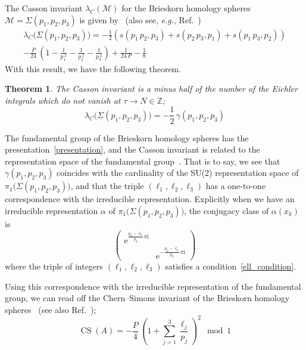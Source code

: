 \documentclass[12pt,reqno]{amsart}
\numberwithin{equation}{section}
\newtheorem{theorem}{Theorem}
\DeclareMathOperator{\CS}{CS}
\begin{document}
The Casson invariant $\lambda_C(\mathcal{M})$
for the Brieskorn homology spheres
 $\mathcal{M}= \Sigma(p_1, p_2, p_3)$
is given by~\cite{FintuStern90a,FukuMatsSaka90}
(also see, \emph{e.g.}, Ref.~)
\begin{multline}
  \label{Casson_sphere}
  \lambda_C\bigl(\Sigma(p_1, p_2, p_3) \bigr)
  =
  -\frac{1}{2}
  \left(
    s(p_1 \, p_2, p_3)+    s(p_2 \, p_3, p_1)+    s(p_1 \, p_3, p_2)
  \right)
    \\
    -
    \frac{P}{24} \,
    \left(
      1-
      \frac{1}{p_1^{~2}}
      -   \frac{1}{p_2^{~2}}
      -  \frac{1}{p_3^{~2}}
    \right)
    + \frac{1}{24  \, P}
    -
    \frac{1}{8}
\end{multline}
With this result, we have the following theorem.

\begin{theorem}
  The Casson invariant is a minus half of the number of the Eichler
  integrals which 
  do not vanish at $\tau\to N\in\mathbb{Z}$;
  \begin{equation}
    \label{gamma_Casson}
    \lambda_C \bigl(\Sigma(p_1, p_2, p_3) \bigr)
    =
    -\frac{1}{2} \,
    \gamma(p_1, p_2, p_3)
  \end{equation}
\end{theorem}


The fundamental group of the Brieskorn homology spheres has the
presentation~\eqref{presentation}, and the Casson
invariant is related to the representation space of the fundamental
group~\cite{FintuStern90a}.
That is to say,
we  see that
$\gamma(p_1, p_2, p_3)$ coincides with the cardinality of the
SU(2) representation space of
$\pi_1\bigl( \Sigma(p_1, p_2, p_3) \bigr)$,
and that the triple $(\ell_1, \ell_2, \ell_3)$ has a one-to-one
correspondence with the irreducible representation.
Explicitly when we have
an irreducible representation $\alpha$ of
$\pi_1\bigl( \Sigma(p_1, p_2, p_3) \bigr)$,
the conjugacy class of $\alpha(x_k)$ is
\begin{equation}
  \label{conjugacy}
  \begin{pmatrix}
    \mathrm{e}^{\frac{p_k - \ell_k}{p_k} \pi \mathrm{i}} &
    \\
    & \mathrm{e}^{- \frac{p_k - \ell_k}{p_k} \pi \mathrm{i}} 
  \end{pmatrix}
\end{equation}
where the triple of integers $(\ell_1, \ell_2, \ell_3)$
satisfies  a  condition~\eqref{ell_condition}.

Using this correspondence with the irreducible representation of the fundamental group,
we can read off the Chern--Simons invariant
of the Brieskorn homology spheres~\cite{FintuStern90a}
(see also Ref.~);
\begin{equation}
  \label{CS_B}
  \CS(A)
  =
  - \frac{P}{4} \, 
  \left(
    1+ \sum_{j=1}^3 \frac{\ell_j}{p_j}
  \right)^2
  \mod 1
\end{equation}
\end{document}
